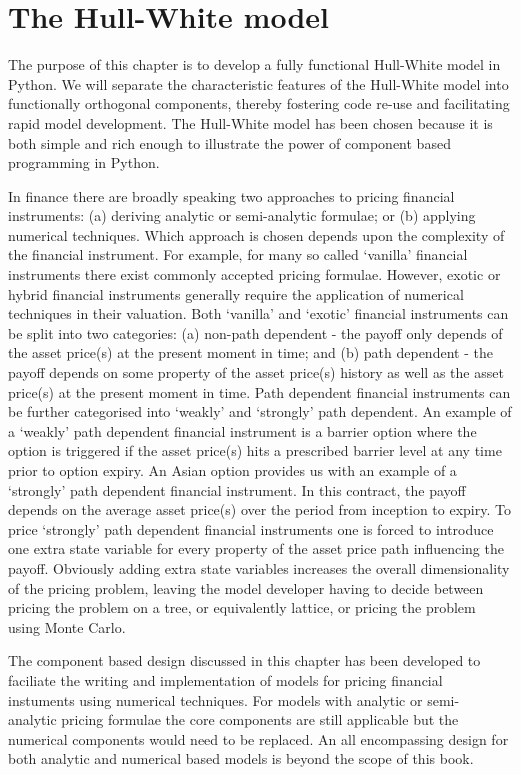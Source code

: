\chapter{The Hull-White model}\label{ch:the-hull-white-model}

The purpose of this chapter is to develop a fully functional
Hull-White model in Python. We will separate the characteristic
features of the Hull-White model into functionally orthogonal
components, thereby fostering code re-use and facilitating rapid model
development. The Hull-White model has been chosen because it is both
simple and rich enough to illustrate the power of component based
programming in Python.

In finance there are broadly speaking two approaches to pricing
financial instruments: (a) deriving analytic or semi-analytic
formulae; or (b) applying numerical techniques. Which approach is
chosen depends upon the complexity of the financial instrument. For
example, for many so called `vanilla' financial instruments there
exist commonly accepted pricing formulae. However, exotic or hybrid
financial instruments generally require the application of numerical
techniques in their valuation. Both `vanilla' and `exotic' financial
instruments can be split into two categories: (a) non-path dependent -
the payoff only depends of the asset price(s) at the present moment in
time; and (b) path dependent - the payoff depends on some property of
the asset price(s) history as well as the asset price(s) at the present
moment in time.  Path dependent financial instruments can be further
categorised into `weakly' and `strongly' path dependent. An example of
a `weakly' path dependent financial instrument is a barrier option
where the option is triggered if the asset price(s) hits a prescribed
barrier level at any time prior to option expiry. An Asian option
provides us with an example of a `strongly' path dependent financial
instrument. In this contract, the payoff depends on the average asset
price(s) over the period from inception to expiry. To price `strongly'
path dependent financial instruments one is forced to introduce one
extra state variable for every property of the asset price path
influencing the payoff. Obviously adding extra state variables
increases the overall dimensionality of the pricing problem, leaving
the model developer having to decide between pricing the problem on a
tree, or equivalently lattice, or pricing the problem using Monte
Carlo.

The component based design discussed in this chapter has been developed 
to faciliate the writing and implementation of models for pricing financial 
instuments using numerical techniques. For models with analytic or semi- 
analytic pricing formulae the core components are still applicable but the  
numerical components would need to be replaced. An all encompassing design 
for both analytic and numerical based models is beyond the scope of this 
book.      
